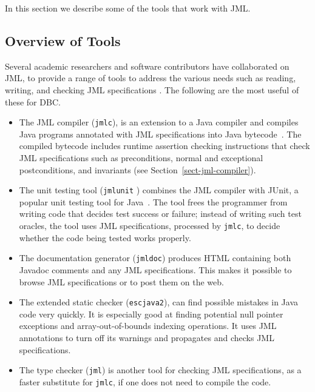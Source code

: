 \documentclass{jotarticle}
\begin{document}
In this section we describe some of the tools that work with JML.

\subsection{Overview of Tools}

Several academic researchers and software contributors have
collaborated on JML, to provide
a range of tools to address the various needs such as
reading, writing, and checking JML specifications \cite{Burdy-etal03}.
The following are the most useful of these for DBC.

\begin{itemize}
\item The JML compiler (\texttt{jmlc}),
is an extension to a Java compiler
and compiles Java programs annotated with JML specifications into Java
bytecode~\cite{Cheon-Leavens02b,Cheon03}.
The compiled bytecode includes
runtime assertion checking instructions that check JML specifications
such as preconditions, normal and exceptional postconditions, and
invariants (see Section~\ref{sect-jml-compiler}).

\item The unit testing tool (\texttt{jmlunit} \cite{Cheon-Leavens02})
combines the JML compiler with JUnit, a popular unit testing tool for
Java~\cite{Beck-Gamma98}. The tool frees the programmer from writing
code that decides test success or failure; instead of writing such
test oracles, the tool uses JML specifications, processed by \texttt{jmlc},
to decide whether the code being tested works properly.

\item The documentation generator (\texttt{jmldoc})
produces HTML containing both Javadoc comments and any JML
specifications.  This makes it possible to browse JML specifications
or to post them on the web.

\item The extended static checker (\texttt{escjava2}),
can find possible mistakes in Java code very quickly.  It is
especially good at finding potential null pointer exceptions and 
array-out-of-bounds indexing operations.  It uses JML annotations to turn off
its warnings and propagates and checks JML specifications.

\item The type checker (\texttt{jml})
is another tool for checking JML specifications, as a faster substitute for
\texttt{jmlc}, if one does not need to compile the code.
\end{itemize}
\end{document}
